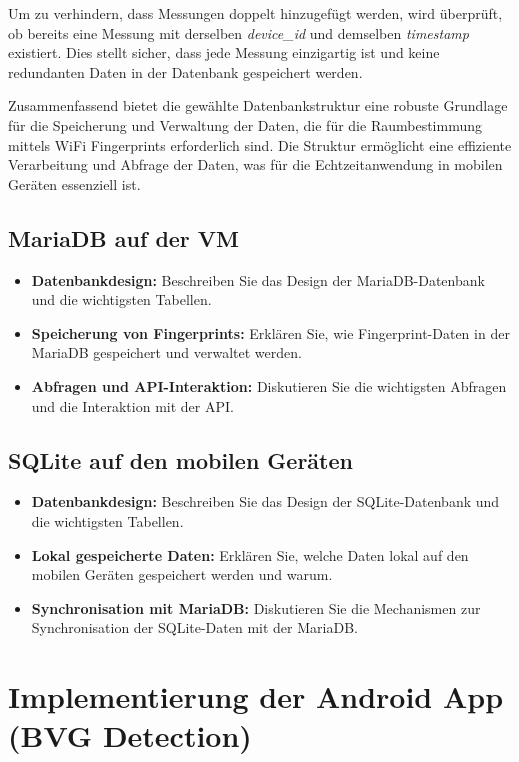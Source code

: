 Um zu verhindern, dass Messungen doppelt hinzugefügt werden, wird überprüft, ob bereits eine Messung mit derselben \textit{device\_id} und demselben \textit{timestamp} existiert. Dies stellt sicher, dass jede Messung einzigartig ist und keine redundanten Daten in der Datenbank gespeichert werden.

Zusammenfassend bietet die gewählte Datenbankstruktur eine robuste Grundlage für die Speicherung und Verwaltung der Daten, die für die Raumbestimmung mittels WiFi Fingerprints erforderlich sind. Die Struktur ermöglicht eine effiziente Verarbeitung und Abfrage der Daten, was für die Echtzeitanwendung in mobilen Geräten essenziell ist.

\subsection{MariaDB auf der VM}
\begin{itemize}
    \item \textbf{Datenbankdesign:} Beschreiben Sie das Design der MariaDB-Datenbank und die wichtigsten Tabellen.
    \item \textbf{Speicherung von Fingerprints:} Erklären Sie, wie Fingerprint-Daten in der MariaDB gespeichert und verwaltet werden.
    \item \textbf{Abfragen und API-Interaktion:} Diskutieren Sie die wichtigsten Abfragen und die Interaktion mit der API.
\end{itemize}

\subsection{SQLite auf den mobilen Geräten}
\begin{itemize}
    \item \textbf{Datenbankdesign:} Beschreiben Sie das Design der SQLite-Datenbank und die wichtigsten Tabellen.
    \item \textbf{Lokal gespeicherte Daten:} Erklären Sie, welche Daten lokal auf den mobilen Geräten gespeichert werden und warum.
    \item \textbf{Synchronisation mit MariaDB:} Diskutieren Sie die Mechanismen zur Synchronisation der SQLite-Daten mit der MariaDB.
\end{itemize}

\section{Implementierung der Android App (BVG Detection)}
